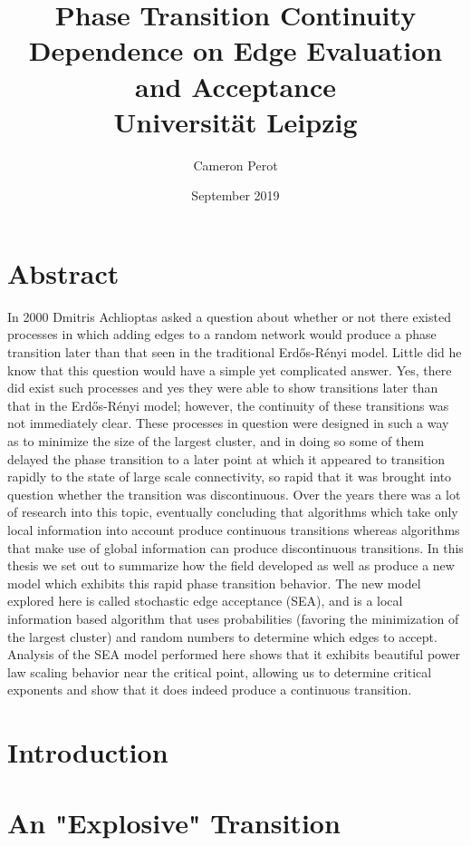 \documentclass[12pt,twoside]{report}
\title{
    {Phase Transition Continuity Dependence on Edge Evaluation and Acceptance}\\
    {\large Universität Leipzig}
    }
\author{Cameron Perot}
\date{September 2019}
\begin{document}
\maketitle
{}

\chapter*{Abstract}
In 2000 Dmitris Achlioptas asked a question about whether or not there existed processes in which adding edges to a random network would produce a phase transition later than that seen in the traditional Erdős-Rényi model.
Little did he know that this question would have a simple yet complicated answer.
Yes, there did exist such processes and yes they were able to show transitions later than that in the Erdős-Rényi model; however, the continuity of these transitions was not immediately clear.
These processes in question were designed in such a way as to minimize the size of the largest cluster, and in doing so some of them delayed the phase transition to a later point at which it appeared to transition rapidly to the state of large scale connectivity, so rapid that it was brought into question whether the transition was discontinuous.
Over the years there was a lot of research into this topic, eventually concluding that algorithms which take only local information into account produce continuous transitions whereas algorithms that make use of global information can produce discontinuous transitions.
In this thesis we set out to summarize how the field developed as well as produce a new model which exhibits this rapid phase transition behavior.
The new model explored here is called stochastic edge acceptance (SEA), and is a local information based algorithm that uses probabilities (favoring the minimization of the largest cluster) and random numbers to determine which edges to accept.
Analysis of the SEA model performed here shows that it exhibits beautiful power law scaling behavior near the critical point, allowing us to determine critical exponents and show that it does indeed produce a continuous transition.


\tableofcontents
\cleardoublepage
{}

\chapter{Introduction}
\label{ch:introduction}


\chapter{An "Explosive" Transition}
\label{ch:explosive}

\end{document}
